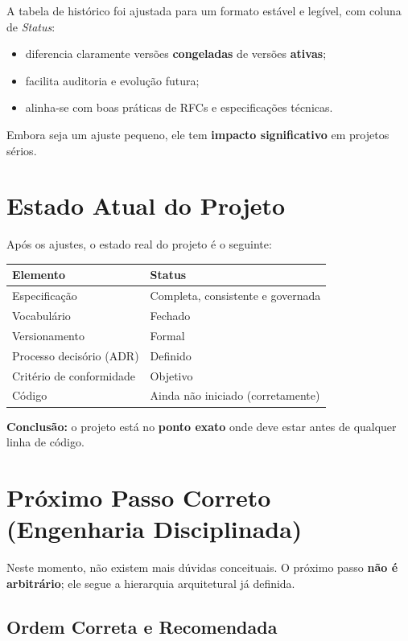 \documentclass[12pt,a4paper]{article}
\begin{document}
	A tabela de histórico foi ajustada para um formato estável e legível, com coluna de \emph{Status}:
	
	\begin{itemize}[leftmargin=2em]
		\item diferencia claramente versões \textbf{congeladas} de versões \textbf{ativas};
		\item facilita auditoria e evolução futura;
		\item alinha-se com boas práticas de RFCs e especificações técnicas.
	\end{itemize}
	
	Embora seja um ajuste pequeno, ele tem \textbf{impacto significativo} em projetos sérios.
	
	\section{Estado Atual do Projeto}
	
	Após os ajustes, o estado real do projeto é o seguinte:
	
	\begin{longtable}{|l|l|}
		\hline
		\textbf{Elemento} & \textbf{Status} \\
		\hline
		Especificação & Completa, consistente e governada \\
		Vocabulário & Fechado \\
		Versionamento & Formal \\
		Processo decisório (ADR) & Definido \\
		Critério de conformidade & Objetivo \\
		Código & Ainda não iniciado (corretamente) \\
		\hline
	\end{longtable}
	
	\bigskip
	\noindent
	\textbf{Conclusão:} o projeto está no \textbf{ponto exato} onde deve estar antes de qualquer linha de código.
	
	\section{Próximo Passo Correto (Engenharia Disciplinada)}
	
	Neste momento, não existem mais dúvidas conceituais.  
	O próximo passo \textbf{não é arbitrário}; ele segue a hierarquia arquitetural já definida.
	
	\subsection{Ordem Correta e Recomendada}
	
\end{document}

